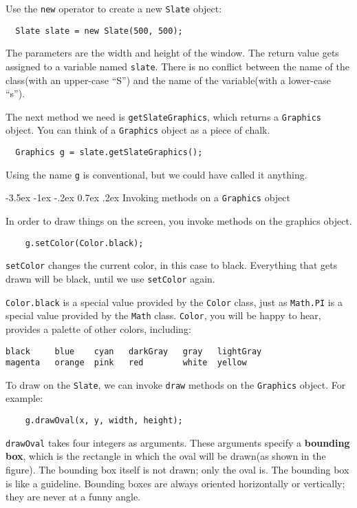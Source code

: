 \documentclass{book}
\makeatletter
\renewcommand{\section}{\@startsection 
    {section} {1} {0mm}%
    {-3.5ex \@plus -1ex \@minus -.2ex}%
    {0.7ex \@plus.2ex}%
    {\normalfont\Large\bfseries}}
\makeatother
\begin{document}
Use the {\tt new} operator to create a new {\tt Slate} object:

\begin{verbatim}
  Slate slate = new Slate(500, 500);
\end{verbatim}
%
The parameters are the width and height of the window.  The return
value gets assigned to a variable named {\tt slate}.  There is no
conflict between the name of the class(with an upper-case ``S'') and
the name of the variable(with a lower-case ``s'').

The next method we need is {\tt getSlateGraphics}, which 
returns a {\tt Graphics} object.
You can think of a {\tt Graphics} object as a piece of chalk.

\begin{verbatim}
  Graphics g = slate.getSlateGraphics();
\end{verbatim}
%
Using the name {\tt g} is conventional, but we could have called it
anything.


\section{Invoking methods on a {\tt Graphics} object}

In order to draw things on the screen, you invoke methods on the
graphics object.  

\begin{verbatim}
    g.setColor(Color.black);
\end{verbatim}
%
{\tt setColor} changes the current color, in this case to
black.  Everything that gets drawn will be black, until we
use {\tt setColor} again.

{\tt Color.black} is a special value provided by the {\tt Color}
class, just as {\tt Math.PI} is a special value provided by the
{\tt Math} class.  {\tt Color}, you will be happy to hear, provides a
palette of other colors, including:

\begin{verbatim}
black     blue    cyan   darkGray   gray   lightGray
magenta	  orange  pink   red        white  yellow
\end{verbatim}
%
To draw on the {\tt Slate}, we can invoke {\tt draw} methods
on the {\tt Graphics} object.  For example:

\begin{verbatim}
    g.drawOval(x, y, width, height);
\end{verbatim}
%
{\tt drawOval} takes four integers as arguments.
These arguments specify a {\bf bounding box}, which is the rectangle
in which the oval will be drawn(as shown in the figure).  The
bounding box itself is not drawn; only the oval is.  The bounding box
is like a guideline.  Bounding boxes are always oriented horizontally
or vertically; they are never at a funny angle.
\end{document}
